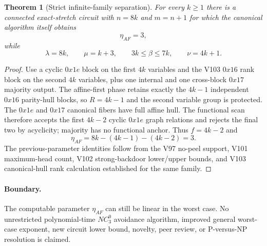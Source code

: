 \documentclass[11pt]{article}
\newtheorem{theorem}{Theorem}
\begin{document}
\begin{theorem}[Strict infinite-family separation]
For every $k\ge1$ there is a connected exact-stretch circuit with $n=8k$ and
$m=n+1$ for which the canonical algorithm itself obtains
\[
\eta_{AF}=3,
\]
while
\[
\lambda=8k,\qquad
\mu=k+3,\qquad
3k\le\beta\le7k,\qquad
\nu=4k+1.
\]
\end{theorem}
\begin{proof}
Use a cyclic $0x1e$ block on the first $4k$ variables and the V103 $0x16$
rank block on the second $4k$ variables, plus one internal and one cross-block
$0x17$ majority output. The affine-first phase retains exactly the $4k-1$
independent $0x16$ parity-hull blocks, so $R=4k-1$ and the second variable group
is protected. The $0x1e$ and $0x17$ canonical fibers have full affine hull.
The functional scan therefore accepts the first $4k-2$ cyclic $0x1e$ graph
relations and rejects the final two by acyclicity; majority has no functional
anchor. Thus $f=4k-2$ and
\[
\eta_{AF}=8k-(4k-1)-(4k-2)=3.
\]
The previous-parameter identities follow from the V97 no-peel support,
V101 maximum-head count, V102 strong-backdoor lower/upper bounds, and V103
canonical-hull rank calculation established for the same family.
\end{proof}

\paragraph{Boundary.}
The computable parameter $\eta_{AF}$ can still be linear in the worst case. No
unrestricted polynomial-time $NC^0_3$ avoidance algorithm, improved general
worst-case exponent, new circuit lower bound, novelty, peer review, or
P-versus-NP resolution is claimed.
\end{document}
